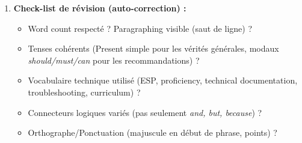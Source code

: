 \documentclass[11pt]{article}
\newcommand{\cle}[1]{{\popxbold\color{popdark}#1}}
\begin{document}
\begin{methode}
\begin{enumerate}
\begin{itemize}
\begin{itemize}
            \end{itemize}
        \item \textbf{Conclusion (1 paragraphe) :} résumé des arguments $\rightarrow$ recommandation/appel à l'action (ex : \emph{« Technical schools should integrate ESP (English for Specific Purposes) modules. »}).
    \end{itemize}
    \item \textbf{Check-list de révision (auto-correction) :}
    \begin{itemize}
        \item \cle{Word count} respecté ? \cle{Paragraphing} visible (saut de ligne) ?
        \item \cle{Tenses} cohérents (Present simple pour les vérités générales, modaux \emph{should/must/can} pour les recommandations) ?
        \item \cle{Vocabulaire technique} utilisé (\cle{ESP, proficiency, technical documentation, troubleshooting, curriculum}) ?
        \item \cle{Connecteurs logiques} variés (pas seulement \emph{and, but, because}) ?
        \item \cle{Orthographe/Ponctuation} (majuscule en début de phrase, points) ?
    \end{itemize}
\end{enumerate}
\end{methode}
\end{document}
